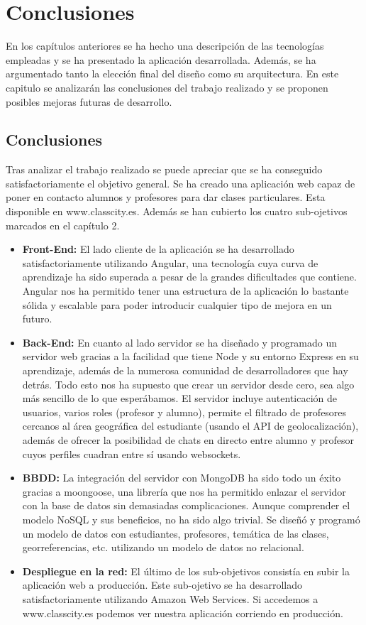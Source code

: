 \chapter{Conclusiones}
En los capítulos anteriores se ha hecho una descripción de las tecnologías empleadas y se ha presentado la aplicación desarrollada. Además, se ha argumentado tanto la elección final del diseño como su arquitectura. En este capitulo se analizarán las conclusiones del trabajo realizado y se proponen posibles mejoras futuras de desarrollo.

\section{Conclusiones}
Tras analizar el trabajo realizado se puede apreciar que se ha conseguido satisfactoriamente el objetivo general. Se ha creado una aplicación web capaz de poner en contacto alumnos y profesores para dar clases particulares. Esta disponible en www.classcity.es. Además se han cubierto los cuatro sub-ojetivos marcados en el capítulo 2.
\begin{itemize}

 \item \textbf {Front-End: }El lado cliente de la aplicación se ha desarrollado satisfactoriamente utilizando Angular, una tecnología cuya curva de aprendizaje ha sido superada a pesar de la grandes dificultades que contiene. Angular nos ha permitido tener una estructura de la aplicación lo bastante sólida y escalable para poder introducir cualquier tipo de mejora en un futuro.
 \item \textbf {Back-End: }En cuanto al lado servidor se ha diseñado y programado un servidor web gracias a la facilidad que tiene Node y su entorno Express en su aprendizaje, además de la numerosa comunidad de desarrolladores que hay detrás. Todo esto nos ha supuesto que crear un servidor desde cero, sea algo más sencillo de lo que esperábamos. El servidor incluye autenticación de usuarios, varios roles (profesor y alumno), permite el filtrado de profesores cercanos al área geográfica del estudiante (usando el API de geolocalización), además de ofrecer la posibilidad de chats en directo entre alumno y profesor cuyos perfiles cuadran entre sí usando websockets.
 \item \textbf {BBDD: } La integración del servidor con MongoDB ha sido todo un éxito gracias a moongoose, una librería que nos ha permitido enlazar el servidor con la base de datos sin demasiadas complicaciones. Aunque comprender el modelo NoSQL y sus beneficios, no ha sido algo trivial. Se diseñó y programó un modelo de datos con estudiantes, profesores, temática de las clases, georreferencias, etc. utilizando un modelo de datos no relacional.
  \item \textbf {Despliegue en la red: }El último de los sub-objetivos consistía en subir la aplicación web a producción. Este sub-ojetivo se ha desarrollado satisfactoriamente utilizando Amazon Web Services. Si accedemos a www.classcity.es podemos ver nuestra aplicación corriendo en producción.

\end{itemize}


